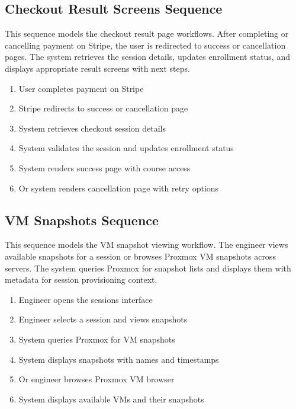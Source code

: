 \subsection{Checkout Result Screens Sequence}
This sequence models the checkout result page workflows. After completing or
cancelling payment on Stripe, the user is redirected to success or cancellation
pages. The system retrieves the session details, updates enrollment status, and
displays appropriate result screens with next steps.

\begin{enumerate}[topsep=0pt,itemsep=1pt,parsep=0pt,partopsep=0pt]
    \item User completes payment on Stripe
    \item Stripe redirects to success or cancellation page
    \item System retrieves checkout session details
    \item System validates the session and updates enrollment status
    \item System renders success page with course access
    \item Or system renders cancellation page with retry options
\end{enumerate}


\subsection{VM Snapshots Sequence}
This sequence models the VM snapshot viewing workflow. The engineer views
available snapshots for a session or browses Proxmox VM snapshots across
servers. The system queries Proxmox for snapshot lists and displays them with
metadata for session provisioning context.

\begin{enumerate}[topsep=0pt,itemsep=1pt,parsep=0pt,partopsep=0pt]
    \item Engineer opens the sessions interface
    \item Engineer selects a session and views snapshots
    \item System queries Proxmox for VM snapshots
    \item System displays snapshots with names and timestamps
    \item Or engineer browses Proxmox VM browser
    \item System displays available VMs and their snapshots
\end{enumerate}


